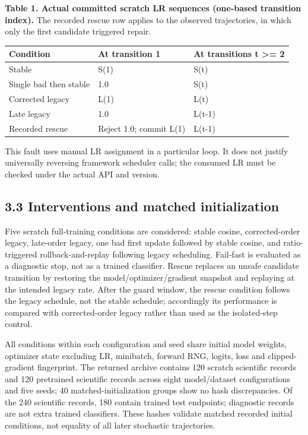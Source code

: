 \documentclass[smallextended]{svjour3}
\begin{document}

\textbf{Table 1. Actual committed scratch LR sequences (one-based transition index).} The recorded rescue row applies to the observed trajectories, in which only the first candidate triggered repair.

\begin{longtable}[]{@{}lll@{}}
\toprule\noalign{}
Condition & At transition 1 & At transitions t \textgreater= 2 \\
\midrule\noalign{}
\endhead
\bottomrule\noalign{}
\endlastfoot
Stable & S(1) & S(t) \\
Single bad then stable & 1.0 & S(t) \\
Corrected legacy & L(1) & L(t) \\
Late legacy & 1.0 & L(t-1) \\
Recorded rescue & Reject 1.0; commit L(1) & L(t-1) \\
\end{longtable}

This fault uses manual LR assignment in a particular loop. It does not justify universally reversing framework scheduler calls; the consumed LR must be checked under the actual API and version.

\subsection{3.3 Interventions and matched initialization}\label{interventions-and-matched-initialization}

Five scratch full-training conditions are considered: stable cosine, corrected-order legacy, late-order legacy, one bad first update followed by stable cosine, and ratio-triggered rollback-and-replay following legacy scheduling. Fail-fast is evaluated as a diagnostic stop, not as a trained classifier. Rescue replaces an unsafe candidate transition by restoring the model/optimizer/gradient snapshot and replaying at the intended legacy rate. After the guard window, the rescue condition follows the legacy schedule, not the stable schedule; accordingly its performance is compared with corrected-order legacy rather than used as the isolated-step control.

All conditions within each configuration and seed share initial model weights, optimizer state excluding LR, minibatch, forward RNG, logits, loss and clipped-gradient fingerprint. The returned archive contains 120 scratch scientific records and 120 pretrained scientific records across eight model/dataset configurations and five seeds; 40 matched-initialization groups show no hash discrepancies. Of the 240 scientific records, 180 contain trained test endpoints; diagnostic records are not extra trained classifiers. These hashes validate matched recorded initial conditions, not equality of all later stochastic trajectories.
\end{document}
